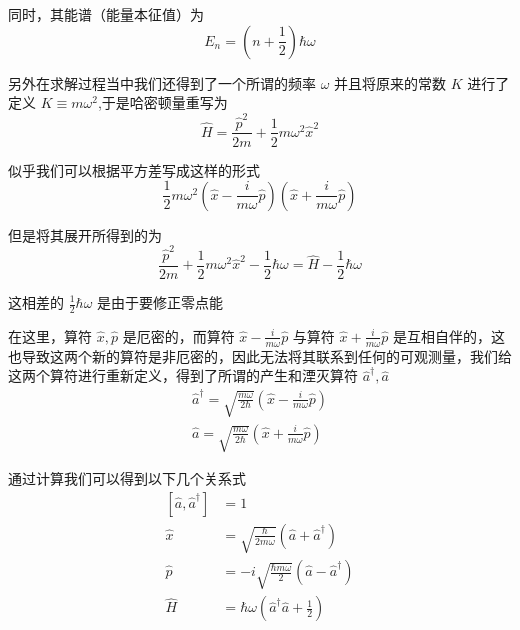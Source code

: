 \documentclass{article}
\begin{document}
同时，其能谱（能量本征值）为 
\begin{equation*}
    E_n = \left(n + \frac{1}{2}\right)\hbar\omega
\end{equation*}

另外在求解过程当中我们还得到了一个所谓的频率 $\omega$ 并且将原来的常数 $K$ 进行了定义 $K\equiv m\omega^2$,于是哈密顿量重写为
\begin{equation*}
    \hat{H} = \frac{\hat{p}^2}{2m} + \frac{1}{2} m \omega^2 \hat{x}^2
\end{equation*}

似乎我们可以根据平方差写成这样的形式
\begin{equation*}
    \frac{1}{2} m \omega^2\left(\hat{x} - \frac{i}{m\omega}\hat{p}\right)\left(\hat{x} + \frac{i}{m\omega}\hat{p}\right)
\end{equation*}

但是将其展开所得到的为
\begin{equation*}
    \frac{\hat{p}^2}{2m} + \frac{1}{2} m \omega^2 \hat{x}^2 - \frac{1}{2}\hbar\omega = \hat{H} - \frac{1}{2}\hbar\omega
\end{equation*}

这相差的 $\displaystyle \frac{1}{2}\hbar\omega $ 是由于要修正零点能

在这里，算符 $\hat{x},\hat{p}$ 是厄密的，而算符 $\displaystyle \hat{x} - \frac{i}{m\omega}\hat{p}$ 与算符 $\displaystyle \hat{x} + \frac{i}{m\omega}\hat{p}$ 是互相自伴的，这也导致这两个新的算符是非厄密的，因此无法将其联系到任何的可观测量，我们给这两个算符进行重新定义，得到了所谓的产生和湮灭算符 $\hat{a}^\dagger,\hat{a}$
\begin{align*}
    \hat{a}^\dagger = \sqrt{\frac{m\omega}{2\hbar}}\left(\hat{x} - \frac{i}{m\omega}\hat{p}\right) \\
    \hat{a} = \sqrt{\frac{m\omega}{2\hbar}}\left(\hat{x} + \frac{i}{m\omega}\hat{p}\right)
\end{align*}

通过计算我们可以得到以下几个关系式
\begin{align*}
    \left[\hat{a},\hat{a}^\dagger\right] &= 1 \\
    \hat{x} &= \sqrt{\frac{\hbar}{2m\omega}} \left(\hat{a} + \hat{a}^\dagger\right) \\
    \hat{p} &= -i\sqrt{\frac{\hbar m \omega}{2}} \left(\hat{a} - \hat{a}^\dagger\right) \\
    \hat{H} &= \hbar \omega \left(\hat{a}^\dagger \hat{a} + \frac{1}{2}\right)
\end{align*}
\end{document}
